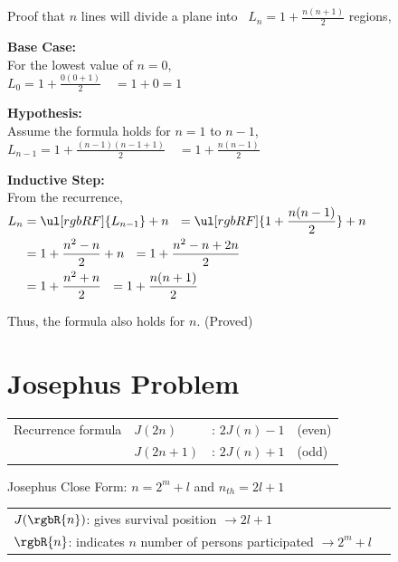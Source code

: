\vspace{1em}
Proof that $n$ lines will divide a plane into \ $L_n = 1 + \frac{n(n+1)}{2}$ regions,

\vspace{0.5em}
\textbf{Base Case:}\\[0.5em]
For the lowest value of $n = 0$,\\[1em]
$L_0 = 1 + \frac{0(0+1)}{2} \quad = 1 + 0 = 1$

\vspace{1em}
\textbf{Hypothesis:}\\[0.5em]
Assume the formula holds for $n = 1$ to $n-1$,\\[1em]
$L_{n-1} = 1 + \frac{{(n-1)}({n-1}+1)}{2}
\quad = 1 + \frac{n(n-1)}{2}$

\vspace{1em}
\textbf{Inductive Step:}\\[0.5em]
From the recurrence,\\[0.5em]
$\begin{aligned}
   L_n & = \ul[rgbRF]{L_{n-1}} + n
   \ \ = \ul[rgbRF]{1 + \frac{n(n-1)}{2}} + n \\
   & = 1 + \frac{n^2-n}{2} + n
   \ \ = 1 + \frac{n^2-n+2n}{2}\\
   & = 1 + \frac{n^2+n}{2}
   \ \ = 1 + \frac{n(n+1)}{2} \\
\end{aligned}$

\vspace{1em}
Thus, the formula also holds for $n$. (Proved)


\section{Josephus Problem}

\begin{tabular}{@{}llll}
   Recurrence formula
   & $J(2n)$   & : $2J(n)-1$ & (even)\\
   & $J(2n+1)$ & : $2J(n)+1$ & (odd)
\end{tabular}

Josephus Close Form: $n = 2^m+l$ \quad and \quad $n_{th} = 2l+1$

\vspace{2em}
\begin{tabular}{@{}ll}
   $J(\rgbR{n})$: gives survival position $\to 2l+1$\\
   $\rgbR{n}$: indicates $n$ number of persons participated $\to 2^m+l$\\
\end{tabular}

